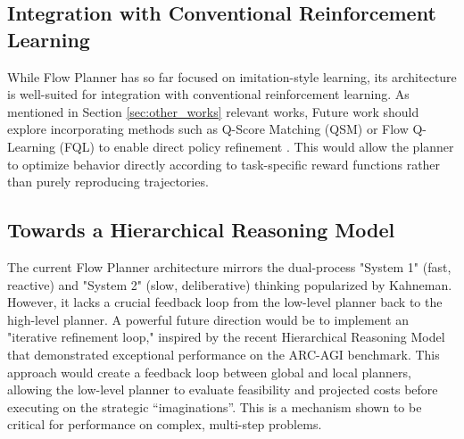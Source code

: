\subsection{Integration with Conventional Reinforcement Learning}
While Flow Planner has so far focused on imitation-style learning, its architecture is well-suited for integration with conventional reinforcement learning. As mentioned in Section \ref{sec:other_works} relevant works, Future work should explore incorporating methods such as Q-Score Matching (QSM) or Flow Q-Learning (FQL) to enable direct policy refinement \cite{psenkaLearningDiffusionModel2025b, parkFlowQLearning2025}. This would allow the planner to optimize behavior directly according to task-specific reward functions rather than purely reproducing trajectories.

\subsection{Towards a Hierarchical Reasoning Model}
The current Flow Planner architecture mirrors the dual-process "System 1" (fast, reactive) and "System 2" (slow, deliberative) thinking popularized by Kahneman. However, it lacks a crucial feedback loop from the low-level planner back to the high-level planner. A powerful future direction would be to implement an "iterative refinement loop," inspired by the recent Hierarchical Reasoning Model \cite{wangHierarchicalReasoningModel2025a} that demonstrated exceptional performance on the ARC-AGI benchmark\cite{cholletARCPrize20242025}. This approach would create a feedback loop between global and local planners, allowing the low-level planner to evaluate feasibility and projected costs before executing on the strategic “imaginations”. This is a mechanism shown to be critical for performance on complex, multi-step problems.